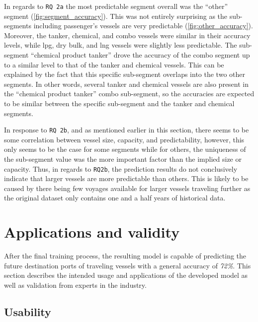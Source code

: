 In regards to \texttt{RQ 2a} the most predictable segment overall was the ``other'' segment (\cref{fig:segment_accuracy}). This was not entirely surprising as the sub-segments including passenger's vessels are very predictable (\cref{fig:other_accuracy}). Moreover, the tanker, chemical, and combo vessels were similar in their accuracy levels, while \acrshort{lpg}, dry bulk, and \acrshort{lng} vessels were slightly less predictable. The sub-segment ``chemical product tanker'' drove the accuracy of the combo segment up to a similar level to that of the tanker and chemical vessels. This can be explained by the fact that this specific sub-segment overlaps into the two other segments. In other words, several tanker and chemical vessels are also present in the ``chemical product tanker'' combo sub-segment, so the accuracies are expected to be similar between the specific sub-segment and the tanker and chemical segments.

In response to \texttt{RQ 2b}, and as mentioned earlier in this section, there seems to be some correlation between vessel size, capacity, and predictability, however, this only seems to be the case for some segments while for others, the uniqueness of the sub-segment value was the more important factor than the implied size or capacity. Thus, in regards to \texttt{RQ2b}, the prediction results do not conclusively indicate that larger vessels are more predictable than others. This is likely to be caused by there being few voyages available for larger vessels traveling further as the original dataset only contains one and a half years of historical data.

\section{Applications and validity}

After the final training process, the resulting model is capable of predicting the future destination ports of traveling vessels with a general accuracy of \textit{72\%}. This section describes the intended usage and applications of the developed model as well as validation from experts in the industry.

\subsection{Usability}
\label{sec:usability}

